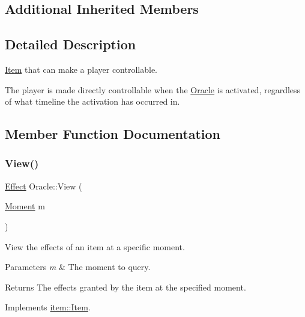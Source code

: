 \subsection*{Additional Inherited Members}


\subsection{Detailed Description}
\hyperlink{classitem_1_1_item}{Item} that can make a player controllable. 

The player is made directly controllable when the \hyperlink{classitem_1_1_oracle}{Oracle} is activated, regardless of what timeline the activation has occurred in. 

\subsection{Member Function Documentation}
\mbox{\label{classitem_1_1_oracle_a9982f1934a769cc461246bab31b8a72d}} 
\subsubsection{\texorpdfstring{View()}{View()}}
{\footnotesize\ttfamily \hyperlink{classitem_1_1_effect}{Effect} Oracle\+::\+View (\begin{DoxyParamCaption}\item[{\hyperlink{classtimeplane_1_1_moment}{Moment}}]{m }\end{DoxyParamCaption})\hspace{0.3cm}{\ttfamily [virtual]}}



View the effects of an item at a specific moment. 


\begin{DoxyParams}{Parameters}
{\em m} & The moment to query. \\
\hline
\end{DoxyParams}
\begin{DoxyReturn}{Returns}
The effects granted by the item at the specified moment. 
\end{DoxyReturn}


Implements \hyperlink{classitem_1_1_item_a400dfeabc4056d36bfd348ff9c51cf7d}{item\+::\+Item}.

\mbox{\label{classitem_1_1_oracle_a61b1924335a4c4443a78ee75f9935b14}} 
